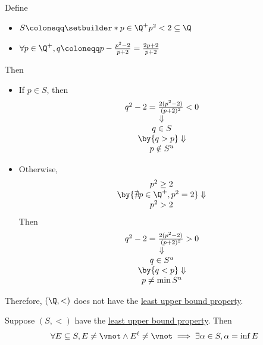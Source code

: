 \begin{example} \label{an1:ex:Q-is-not-complete}
  Define
  \begin{itemize}
    \item $S \coloneqq \setbuilder*{p \in \Q^{+}}{p^{2} < 2} \subseteq \Q$
    \item $\forall p \in \Q^{+}, q \coloneqq p - \frac{p^{2} - 2}{p + 2} = \frac{2p + 2}{p + 2}$
  \end{itemize}
  Then
  \begin{itemize}
    \item If $p \in S$, then
          \[
            \begin{array}{c}
              q^{2} - 2 = \frac{2(p^{2} - 2)}{(p + 2)^{2}} < 0 \\
              \Downarrow                                       \\
              q \in S                                          \\
              \by{\ensuremath{q > p}} \Downarrow               \\
              p \notin S^{u}
            \end{array}
          \]
    \item Otherwise,
          \[
            \begin{array}{c}
              p^{2} \geq 2                                                  \\
              \by{\ensuremath{\nexists p \in \Q^{+}, p^{2} = 2}} \Downarrow \\
              p^{2} > 2
            \end{array}
          \]
          Then
          \[
            \begin{array}{c}
              q^{2} - 2 = \frac{2(p^{2} - 2)}{(p + 2)^{2}} > 0 \\
              \Downarrow                                       \\
              q \in S^{u}                                      \\
              \by{\ensuremath{q < p}} \Downarrow               \\
              p \neq \min S^{u}
            \end{array}
          \]
  \end{itemize}
  Therefore, $(\Q, <)$ does not have the \hyperref[an1:def:least-upper-bound-property]{least upper bound property}.
\end{example}

\begin{theorem} \label{an1:thm:greatest-lower-bound-property}
  Suppose $(S, <)$ have the \hyperref[an1:def:least-upper-bound-property]{least upper bound property}. Then
  \[
    \forall E \subseteq S, E \neq \vnot \land E^{\ell} \neq \vnot \implies \exists \alpha \in S, \alpha = \inf E
  \]
\end{theorem}

